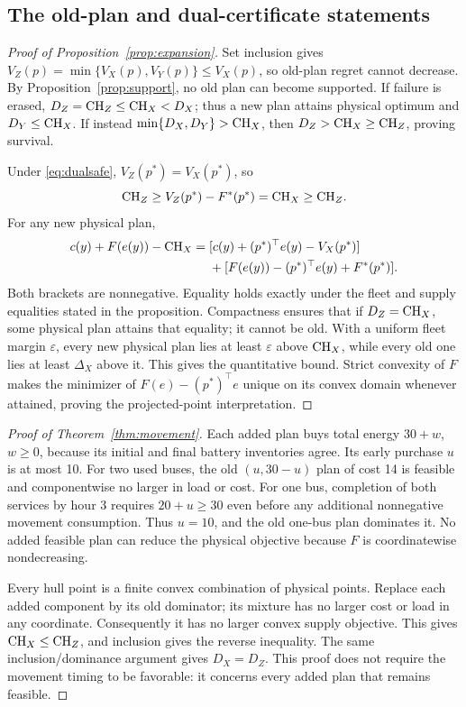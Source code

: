 \subsection{The old-plan and dual-certificate statements}\label{app:expansion}
\begin{proof}[Proof of Proposition~\ref{prop:expansion}]
Set inclusion gives $V_Z(p)=\min\{V_X(p),V_Y(p)\}\le V_X(p)$, so
old-plan regret cannot decrease. By Proposition~\ref{prop:support}, no old
plan can become supported. If failure is erased, $D_Z=\mathrm{CH}_Z\le\mathrm{CH}_X<D_X$;
thus a new plan attains physical optimum and $D_Y\le\mathrm{CH}_X$. If instead
$\min\{D_X,D_Y\}>\mathrm{CH}_X$, then $D_Z>\mathrm{CH}_X\ge\mathrm{CH}_Z$, proving survival.

Under \eqref{eq:dualsafe}, $V_Z(p^*)=V_X(p^*)$, so
\[
 \mathrm{CH}_Z\ge V_Z(p^*)-F^*(p^*)=\mathrm{CH}_X\ge\mathrm{CH}_Z.
\]
For any new physical plan,
\begin{align*}
 c(y)+F(e(y))-\mathrm{CH}_X
 ={}&[c(y)+(p^*)^\top e(y)-V_X(p^*)]\\
 &+[F(e(y))-(p^*)^\top e(y)+F^*(p^*)].
\end{align*}
Both brackets are nonnegative. Equality holds exactly under the fleet and
supply equalities stated in the proposition. Compactness ensures that if
$D_Z=\mathrm{CH}_X$, some physical plan attains that equality; it cannot be old.
With a uniform fleet margin $\varepsilon$, every new physical plan lies
at least $\varepsilon$ above $\mathrm{CH}_X$, while every old one lies at least
$\Delta_X$ above it. This gives the quantitative bound. Strict convexity
of $F$ makes the minimizer of $F(e)-(p^*)^\top e$ unique on its convex
domain whenever attained, proving the projected-point interpretation.
\end{proof}

\begin{proof}[Proof of Theorem~\ref{thm:movement}]
Each added plan buys total energy $30+w$, $w\ge0$, because its initial
and final battery inventories agree. Its early purchase $u$ is at most 10.
For two used buses, the old $(u,30-u)$ plan of cost 14 is feasible and
componentwise no larger in load or cost. For one bus, completion of both
services by hour 3 requires $20+u\ge30$ even before any additional
nonnegative movement consumption. Thus $u=10$, and the old one-bus
plan dominates it. No added feasible plan can reduce the physical
objective because $F$ is coordinatewise nondecreasing.

Every hull point is a finite convex combination of physical points.
Replace each added component by its old dominator; its mixture has no
larger cost or load in any coordinate. Consequently it has no larger
convex supply objective. This gives $\mathrm{CH}_X\le\mathrm{CH}_Z$, and inclusion
gives the reverse inequality. The same inclusion/dominance argument
gives $D_X=D_Z$. This proof does not require the movement timing to be
favorable: it concerns every added plan that remains feasible.
\end{proof}

